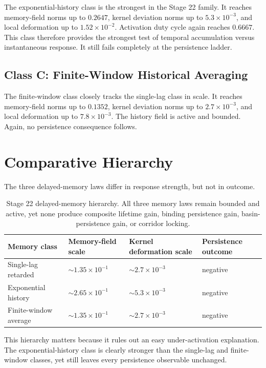 \documentclass[11pt]{article}
\begin{document}
The exponential-history class is the strongest in the Stage 22 family. It reaches memory-field norms up to $0.2647$, kernel deviation norms up to $5.3\times10^{-3}$, and local deformation up to $1.52\times10^{-2}$. Activation duty cycle again reaches $0.6667$. This class therefore provides the strongest test of temporal accumulation versus instantaneous response. It still fails completely at the persistence ladder.

\subsection{Class C: Finite-Window Historical Averaging}

The finite-window class closely tracks the single-lag class in scale. It reaches memory-field norms up to $0.1352$, kernel deviation norms up to $2.7\times10^{-3}$, and local deformation up to $7.8\times10^{-3}$. The history field is active and bounded. Again, no persistence consequence follows.

\section{Comparative Hierarchy}

The three delayed-memory laws differ in response strength, but not in outcome.

\begin{table}[h]
\centering
\begin{tabular}{@{}llll@{}}
\toprule
Memory class & Memory-field scale & Kernel deformation scale & Persistence outcome \\
\midrule
Single-lag retarded & $\sim 1.35\times10^{-1}$ & $\sim 2.7\times10^{-3}$ & negative \\
Exponential history & $\sim 2.65\times10^{-1}$ & $\sim 5.3\times10^{-3}$ & negative \\
Finite-window average & $\sim 1.35\times10^{-1}$ & $\sim 2.7\times10^{-3}$ & negative \\
\bottomrule
\end{tabular}
\caption{Stage 22 delayed-memory hierarchy. All three memory laws remain bounded and active, yet none produce composite lifetime gain, binding persistence gain, basin-persistence gain, or corridor locking.}
\end{table}

This hierarchy matters because it rules out an easy under-activation explanation. The exponential-history class is clearly stronger than the single-lag and finite-window classes, yet still leaves every persistence observable unchanged.
\end{document}
